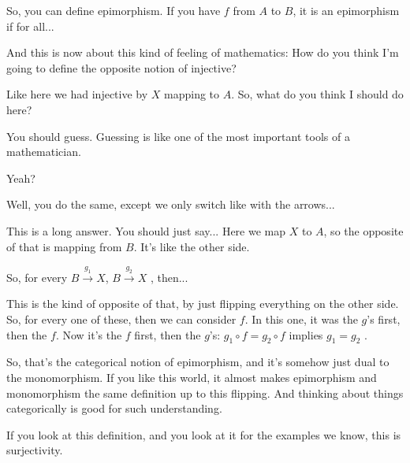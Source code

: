 \begin{speech}[00:08:27 - 00:09:20]
So, you can define epimorphism.  If you have $f$ from $A$ to $B$, it is an epimorphism  if  for all...

And this is now about this kind of feeling of mathematics: How do you think I'm going to define the opposite notion of injective?

Like here we had injective by $X$ mapping to $A$. So, what do you think I should do here?

You should guess. Guessing is like one of the most important tools of a mathematician.

Yeah?
\end{speech}

\begin{student}
Well, you do the same, except we only switch like with the arrows...
\end{student}

\begin{speech}[00:09:25 - 00:10:37]
This is a long answer. You should just say... Here we map $X$ to $A$, so the opposite of that is mapping from $B$. It's like the other side.

So, for every $B \xrightarrow{g_1} X$, $B \xrightarrow{g_2} X$ , then...

This is the kind of opposite of that, by just flipping everything on the other side. So, for every one of these, then we can consider $f$. In this one, it was the $g$'s first, then the $f$. Now it's the $f$ first, then the $g$'s: $g_1 \circ f = g_2 \circ f$ implies $g_1 = g_2$ .

So, that's the categorical notion of epimorphism, and it's somehow just dual to the monomorphism. If you like this world, it almost makes epimorphism and monomorphism the same definition up to this flipping. And thinking about things categorically is good for such understanding.

If you look at this definition, and you look at it for the examples we know, this is surjectivity.
\end{speech}

